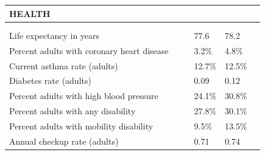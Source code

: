 \documentclass[9pt]{report}
\begin{document}
\newpage
\setlength{\tabcolsep}{.01in} %
\begin{tabular}{p{.10in}p{.10in}p{.10in}p{3.7in}>{\hfill}p{.85in}>{\hfill}p{.85in}>{\hfill}p{.85in}>{\hfill}p{.85in}p{0.1in}}
\multicolumn{9}{l}{\parbox{7.1in}{\raggedright{\large{\strut\textbf{HEALTH}\strut}}}} \\ 
\hline
\multicolumn{4}{l}{\parbox{3.5in}{\raggedright{\textbf{}}}} & \multicolumn{1}{r}{\parbox{.85in}{\strut\raggedleft{\textbf{}\strut}}} & \multicolumn{1}{r}{\parbox{.85in}{\strut\raggedleft{\textbf{}\strut}}} & \multicolumn{1}{r}{\parbox{.85in}{\strut{}}} & \multicolumn{1}{r}{\parbox{.85in}{\strut{}}} & \\ 
\multicolumn{9}{l}{} \\ 
\multicolumn{4}{l}{\parbox{3.6in}{\strut\raggedright{{Life expectancy in years}}\strut}} &  &  & 77.6 & 78.2 & \multicolumn{1}{l}{}  \\ 
\multicolumn{4}{l}{\parbox{3.6in}{\strut\raggedright{{Percent adults with coronary heart disease}}\strut}} &  &  & 3.2\% & 4.8\% & \multicolumn{1}{l}{}  \\ 
\multicolumn{4}{l}{\parbox{3.6in}{\strut\raggedright{{Current asthma rate (adults)}}\strut}} &  &  & 12.7\% & 12.5\% & \multicolumn{1}{l}{}  \\ 
\multicolumn{4}{l}{\parbox{3.6in}{\strut\raggedright{{Diabetes rate (adults)}}\strut}} &  &  & 0.09 & 0.12 & \multicolumn{1}{l}{}  \\ 
\multicolumn{4}{l}{\parbox{3.6in}{\strut\raggedright{{Percent adults with high blood pressure}}\strut}} &  &  & 24.1\% & 30.8\% & \multicolumn{1}{l}{}  \\ 
\multicolumn{4}{l}{\parbox{3.6in}{\strut\raggedright{{Percent adults with any disability}}\strut}} &  &  & 27.8\% & 30.1\% & \multicolumn{1}{l}{}  \\ 
\multicolumn{4}{l}{\parbox{3.6in}{\strut\raggedright{{Percent adults with mobility disability}}\strut}} &  &  & 9.5\% & 13.5\% & \multicolumn{1}{l}{}  \\ 
\multicolumn{4}{l}{\parbox{3.6in}{\strut\raggedright{{Annual checkup rate (adults)}}\strut}} &  &  & 0.71 & 0.74 & \multicolumn{1}{l}{}  \\ 

\end{tabular}
\end{document}
